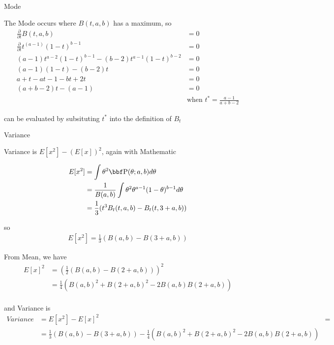 \documentclass[12pt,letterpaper,fleqn]{hmcpset}
\begin{document}
\begin{solution}
\newpage
\item Mode

  The Mode occurs where $B(t,a,b)$ has a maximum, so
\begin{equation}\begin{aligned}
    \frac{\partial}{\partial t} B(t,a,b) & = 0 \\
    \frac{\partial}{\partial t} t^{(a-1)}(1-t)^{b-1} & = 0 \\
    (a-1)t^{a-2}(1-t)^{b-1} - (b-2)t^{a-1}(1-t)^{b-2} & = 0 \\
    (a-1)(1-t) - (b-2)t & = 0 \\
    a + t - at - 1 - bt + 2t & = 0 \\
    (a + b - 2)t - (a - 1) & = 0 \\
    & \text{when  } t^* = \frac{a - 1}{a + b - 2}
\end{aligned}\end{equation}

can be evaluated by subsituting $t^*$ into the definition of $B_t$

\item Variance

Variance is $E[x^{2}] - (E[x])^{2}$, again with Mathematic

\begin{equation}\begin{aligned}
E[x^2] & = \int \theta^2 \PP(\theta; a,b) d\theta \\
& = \frac{1}{B(a,b)} \int \theta^2 \theta^{a-1}(1-\theta)^{b-1} d\theta \\
& = \frac{1}{3}( t^3 B_t(t,a,b) - B_t(t,3+a,b) )
\end{aligned}\end{equation}

so 
\begin{equation}\begin{aligned}
E[x^2] = \frac{1}{3} ( B(a,b) - B(3+a, b) )
\end{aligned}\end{equation}

From Mean, we have
\begin{equation}\begin{aligned}
E[x]^2  & = (\frac{1}{2} ( B(a,b) - B(2 + a, b) ))^2 \\
 & = \frac{1}{4} ( B(a,b)^2 + B(2 + a, b)^2 - 2B(a,b)B(2+a,b) ) \\
\end{aligned}\end{equation}

and Variance is
\begin{equation}\begin{aligned}
    Variance & = E[x^2] - E[x]^2 & = \\
& = \frac{1}{3} ( B(a,b) - B(3+a, b) ) - \frac{1}{4} ( B(a,b)^2 + B(2 + a, b)^2 - 2B(a,b)B(2+a,b) )
\end{aligned}\end{equation}


\vfill
\end{solution}
\newpage
\end{document}
